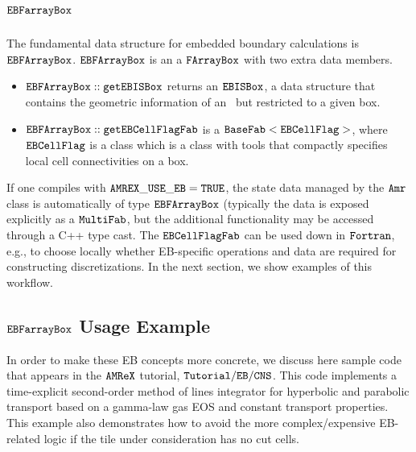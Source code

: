 \section{$\tt{EBFarrayBox}$}

The fundamental data structure for embedded boundary calculations is 
$\tt{EBFArrayBox}$. $\tt{EBFArrayBox}$ is an a $\tt{FArrayBox}$ with two extra
data members.
\begin{itemize}
\item $\tt{EBFArrayBox::getEBISBox}$ returns an $\tt{EBISBox}$, a data
  structure that contains the geometric information of an \ebis\ but
  restricted to a given box.
\item $\tt{EBFArrayBox::getEBCellFlagFab}$  is a
  $\tt{BaseFab<EBCellFlag>}$, where $\tt{EBCellFlag}$ is a class which
  is a class with tools that compactly specifies local cell connectivities
  on a box.
\end{itemize}
If one compiles with $\tt{AMREX\_USE\_EB = TRUE}$, the state data managed by
the ${\tt Amr}$ class is automatically of type $\tt{EBFArrayBox}$ (typically the data
is exposed explicitly as a $\tt{MultiFab}$, but the additional functionality
may be accessed through a C++ type cast. The
$\tt{EBCellFlagFab}$ can be used down in $\tt{Fortran}$, e.g., to choose
locally whether EB-specific operations and data are required for constructing
discretizations.  In the next section, we show examples of this workflow.

\subsection{$\tt{EBFarrayBox}$ Usage Example}
In order to make these EB concepts more concrete, we discuss here sample code
that appears in the $\tt{AMReX}$ tutorial, $\tt{Tutorial/EB/CNS}$.  This code
implements a time-explicit second-order method of lines integrator for hyperbolic
and parabolic transport based on a gamma-law gas EOS and constant transport
properties.  This example also demonstrates how to avoid the more complex/expensive
EB-related logic if the tile under consideration has no cut cells.

